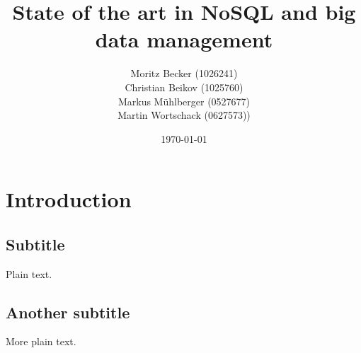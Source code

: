 \documentclass[twocolumn,a4paper]{sig-alternate}
\title{State of the art in NoSQL and big data management}
\author{Moritz Becker (1026241) \\ Christian Beikov (1025760) \\ Markus Mühlberger
(0527677) \\ Martin Wortschack (0627573))}
\date{\today}
\begin{document}
\maketitle



\section{Introduction}

\subsection{Subtitle}

Plain text.

\subsection{Another subtitle}

More plain text.
\end{document}
